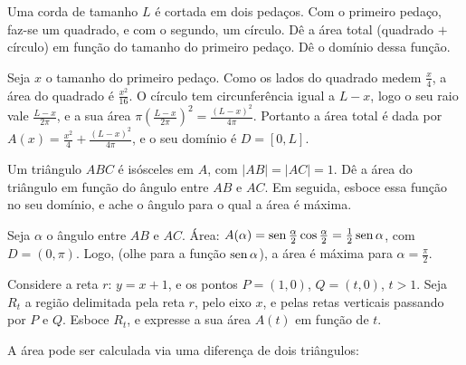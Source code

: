 \begin{exo}
Uma corda de tamanho $L$ é cortada em dois pedaços. Com o primeiro pedaço,
faz-se um quadrado, e com o segundo, um círculo. Dê a área total (quadrado $+$ círculo) em
função do tamanho do primeiro pedaço. Dê o domínio dessa função.
\begin{sol}
Seja $x$ o tamanho do primeiro pedaço. Como os lados do quadrado medem
$\tfrac{x}{4}$, a área do quadrado é $\tfrac{x^2}{16}$. O círculo tem
circunferência igual a $L-x$, logo o seu raio vale $\tfrac{L-x}{2\pi}$, e a sua
área 
$\pi(\tfrac{L-x}{2\pi})^2=\tfrac{(L-x)^2}{4\pi}$. Portanto a área total é dada por
$A(x)=\tfrac{x^2}{4}+\tfrac{(L-x)^2}{4\pi}$, e o seu domínio é $D=[0,L]$.
\end{sol}
\end{exo}

\begin{exo}\label{Exo:airesousladroite}
Um triângulo $ABC$ é isósceles em $A$, com $|AB|=|AC|=1$.
Dê a área do triângulo em função do ângulo entre $AB$ e $AC$.
Em seguida, esboce essa função no seu domínio, e ache o ângulo para o qual a área é máxima.
\begin{sol}
Seja $\alpha$ o ângulo entre $AB$ e $AC$.
Área: $A(\alpha)=\operatorname{sen} \tfrac{\alpha}{2}\cos\tfrac{\alpha}{2}=\tfrac12\operatorname{sen} \alpha$, com
$D=(0,\pi)$. 
Logo, (olhe para a função $\operatorname{sen} \alpha$), a área é máxima para $\alpha=\tfrac{\pi}{2}$.
\end{sol}
\end{exo}

\begin{exo}\label{Exo:primeiraarea}
 Considere a reta $r:\, y=x+1$, e os pontos $P=(1,0)$, $Q=(t,0)$, $t>1$. 
Seja $R_t$ a região delimitada pela reta $r$, pelo eixo $x$, 
e pelas retas verticais passando por $P$ e $Q$. Esboce $R_t$, e expresse a sua área
$A(t)$ em  função de $t$.
\begin{sol}
A área pode ser calculada via uma diferença de dois triângulos:
\begin{center}
\begin{bmlimage}\end{bmlimage}
\end{center}
\end{sol}
\end{exo}


